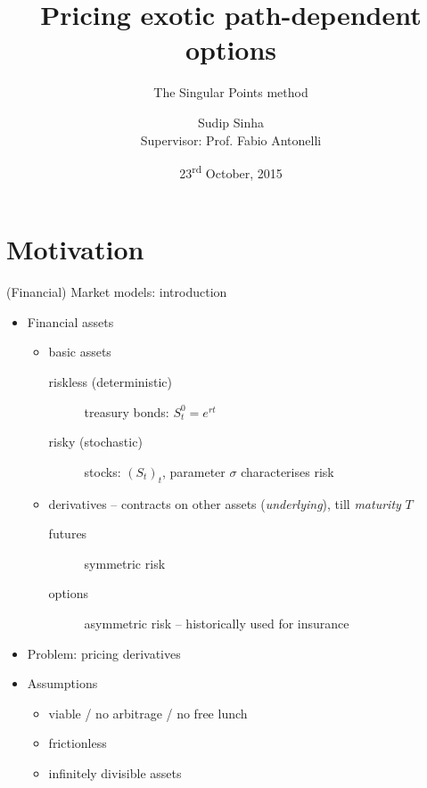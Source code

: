 \documentclass[utf8,t,xcolor=svgnames]{beamer}
\title{Pricing exotic path-dependent options}
\subtitle{The Singular Points method \cite{Gaudenzi2010,Gaudenzi2011}}
\date[2015-10-23]{23\textsuperscript{rd} October, 2015}
\institute[MathMods]{MathMods\\{Università degli Studi dell'Aquila}}
\author[Sudip Sinha]{Sudip Sinha\\{Supervisor: Prof. Fabio Antonelli}}
\begin{document}
\begin{frame}[plain]
	\maketitle
\end{frame}


\section{Motivation}

\begin{frame}{(Financial) Market models: introduction}
	\begin{itemize}
		
		\item Financial assets
		\begin{itemize}
			\item basic assets
			\begin{description}
				\item[riskless (deterministic)] treasury bonds: $ S_t^0 = e^{rt} $
				\item[risky (stochastic)] stocks: $ (S_t)_t $, parameter $ \sigma $ characterises risk
			\end{description}
			\item derivatives -- contracts on other assets (\emph{underlying}), till \emph{maturity} $ T $
			\begin{description}
				\item[futures] symmetric risk
				\item[options] asymmetric risk -- historically used for insurance
			\end{description}
		\end{itemize}
		
		\item Problem: pricing derivatives
		
		\item Assumptions
		\begin{itemize}
			\item viable / no arbitrage / no free lunch
			\item frictionless
			\item infinitely divisible assets
		\end{itemize}
	\end{itemize}
	
\end{frame}
\end{document}
